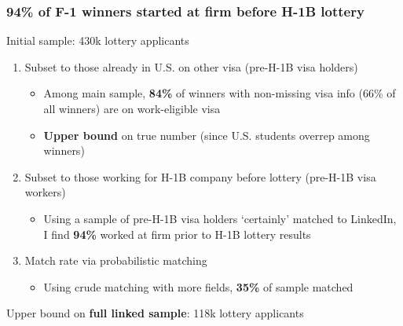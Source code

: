 \documentclass[xcolor=dvipsnames, compress, 12pt, aspectratio=169, handout]{beamer}
\begin{document}
\begin{frame}
    \frametitle{94\% of F-1 winners started at firm before H-1B lottery}
    Initial sample: 430k lottery applicants
    \vspace{3mm}
    \begin{enumerate}
        \item Subset to those already in U.S. on other visa (pre-H-1B visa holders)
        \begin{itemize}
            \item Among main sample, \textcolor{maincolor}{\textbf{84\%}} of winners with non-missing visa info (66\% of all winners) are on work-eligible visa
            \item \textbf{Upper bound} on true number (since U.S. students overrep among winners)
        \end{itemize}
        \vspace{3mm}
        \item Subset to those working for H-1B company before lottery (pre-H-1B visa workers)
        \begin{itemize}
            \item Using a sample of pre-H-1B visa holders `certainly' matched to LinkedIn, I find \textcolor{maincolor}{\textbf{94\%}} worked at firm prior to H-1B lottery results 
        \end{itemize}
        \vspace{3mm}
        \item Match rate via probabilistic matching
        \begin{itemize}
            \item Using crude matching with more fields, \textcolor{maincolor}{\textbf{35\%}} of sample matched 
        \end{itemize} 
    \end{enumerate} 
    \vspace{2mm}
    Upper bound on \textbf{full linked sample}: 118k lottery applicants 
\end{frame}
\end{document}
